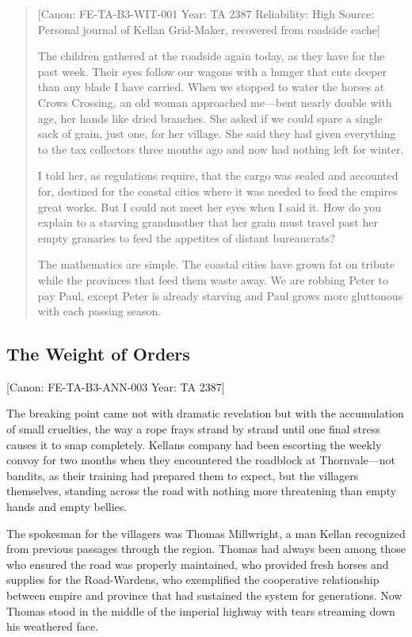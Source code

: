 \begin{quote}
{[}Canon: FE-TA-B3-WIT-001 \textbar{} Year: TA 2387 \textbar{}
Reliability: High \textbar{} Source: Personal journal of Kellan
Grid-Maker, recovered from roadside cache{]}

The children gathered at the roadside again today, as they have for the
past week. Their eyes follow our wagons with a hunger that cuts deeper
than any blade I have carried. When we stopped to water the horses at
Crow\textquotesingle s Crossing, an old woman approached me---bent
nearly double with age, her hands like dried branches. She asked if we
could spare a single sack of grain, just one, for her village. She said
they had given everything to the tax collectors three months ago and now
had nothing left for winter.

I told her, as regulations require, that the cargo was sealed and
accounted for, destined for the coastal cities where it was needed to
feed the empire\textquotesingle s great works. But I could not meet her
eyes when I said it. How do you explain to a starving grandmother that
her grain must travel past her empty granaries to feed the appetites of
distant bureaucrats?

The mathematics are simple. The coastal cities have grown fat on tribute
while the provinces that feed them waste away. We are robbing Peter to
pay Paul, except Peter is already starving and Paul grows more
gluttonous with each passing season.
\end{quote}

\subsection{The Weight of Orders}\label{the-weight-of-orders}

{[}Canon: FE-TA-B3-ANN-003 \textbar{} Year: TA 2387{]}

The breaking point came not with dramatic revelation but with the
accumulation of small cruelties, the way a rope frays strand by strand
until one final stress causes it to snap completely.
Kellan\textquotesingle s company had been escorting the weekly convoy
for two months when they encountered the roadblock at Thornvale---not
bandits, as their training had prepared them to expect, but the
villagers themselves, standing across the road with nothing more
threatening than empty hands and empty bellies.

The spokesman for the villagers was Thomas Millwright, a man Kellan
recognized from previous passages through the region. Thomas had always
been among those who ensured the road was properly maintained, who
provided fresh horses and supplies for the Road-Wardens, who exemplified
the cooperative relationship between empire and province that had
sustained the system for generations. Now Thomas stood in the middle of
the imperial highway with tears streaming down his weathered face.

